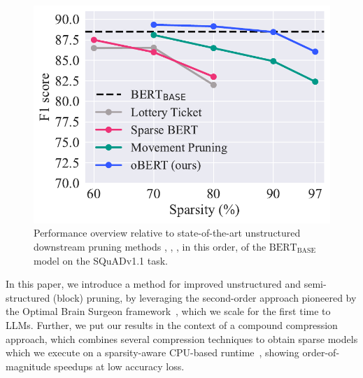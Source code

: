 \documentclass[11pt]{article}
\newcommand{\bert}{$\textrm{BERT}_{\textrm{BASE}}\,$}
\begin{document}
 \begin{figure}[t]
    \centering
    \includegraphics[scale=0.5]{media/overview_squad_F1.pdf}
    \vspace{-0.1in}
    \caption{Performance overview relative to state-of-the-art unstructured downstream pruning methods \citet{Chen2020TheLT}, \citet{Xu2021RethinkingNP}, \citet{Sanh2020MovementPA}, in this order, of the \bert model on the SQuADv1.1 task.}
    \label{fig:squad_F1}
    \vspace{-0.3in}
\end{figure}

In this paper, we introduce a method for improved unstructured and semi-structured (block) pruning, by leveraging the second-order approach pioneered by the Optimal Brain Surgeon framework~\cite{LeCun1989OptimalBD, hassibi1993second}, which we scale for the first time to LLMs. Further, we put our results in the context of a compound compression approach, which combines several compression techniques to obtain sparse models which we execute on a sparsity-aware CPU-based runtime~\cite{deepsparse}, showing order-of-magnitude speedups at low accuracy loss.
\end{document}
